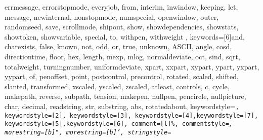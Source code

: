 {{        errmessage, errorstopmode, everyjob, from, interim,%
        inwindow, keeping, let, message, newinternal,%
        nonstopmode, numspecial, openwindow, outer, randomseed,%
        save, scrollmode, shipout, show, showdependencies,%
        showstats, showtoken, showvariable, special, to, withpen,%
        withweight
    }, %
    keywords=[6]{and, charexists, false, known, not, odd, or, true, unknown,%
        ASCII, angle, cosd, directiontime, floor, hex, length,%
        mexp, mlog, normaldeviate, oct, sind, sqrt, totalweight,%
        turningnumber, uniformdeviate, xpart, xxpart, xypart, ypart, yxpart, yypart,%
        of, penoffset, point, postcontrol, precontrol, rotated,%
        scaled, shifted, slanted, transformed, xscaled, yscaled, zscaled,%
        atleast, controls, c, cycle, makepath, reverse, subpath, tension,%
        makepen, nullpen, pencircle, nullpicture,%
    char, decimal, readstring, str, substring, abs, rotatedabout},%
    keywordstyle=\color{mpkeyword}\tt, keywordstyle=[2]\tt\color{mpinternalconstants},%
    keywordstyle=[3]\tt\color{mpdef}, keywordstyle=[4]\tt\color{mptype},keywordstyle=[7]\tt\color{mpdef},%
    keywordstyle=[5]\tt\color{mfcmd},keywordstyle=[6]\tt\color{mpexp},%
    comment=[l]{\%},%
    commentstyle=\it\small\color{texcomment},
    morestring=[b]",
    morestring=[b]',
    stringstyle=\color{mpstring}%
}

\fi
